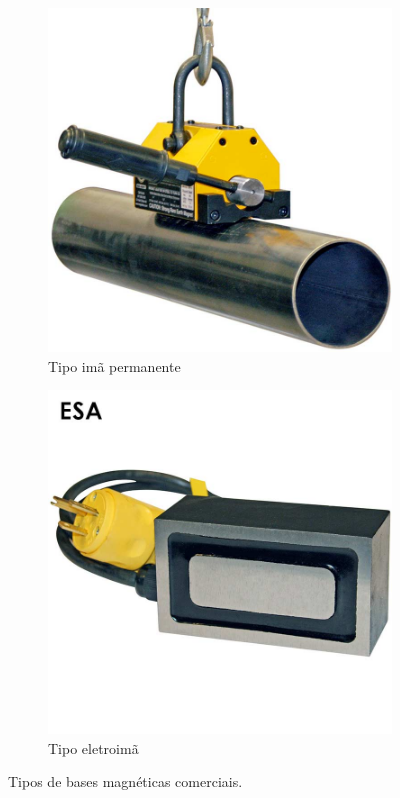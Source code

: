 \begin{figure}[h!]
\begin{subfigure}[b]{0.5\columnwidth}
  \centering
  \includegraphics[width=.9\columnwidth]{figs/base/mangnetpipe}
  \caption{Tipo imã permanente}
  \label{fig:sfig1}
\end{subfigure}%
\begin{subfigure}[b]{0.4\columnwidth}
  \centering
  \includegraphics[width=.9\columnwidth]{figs/base/eletromagnet}
  \caption{Tipo eletroimã}
  \label{fig:sfig2}
\end{subfigure}
\caption{Tipos de bases magnéticas comerciais.}
\label{fig::base::imas}
\end{figure}

